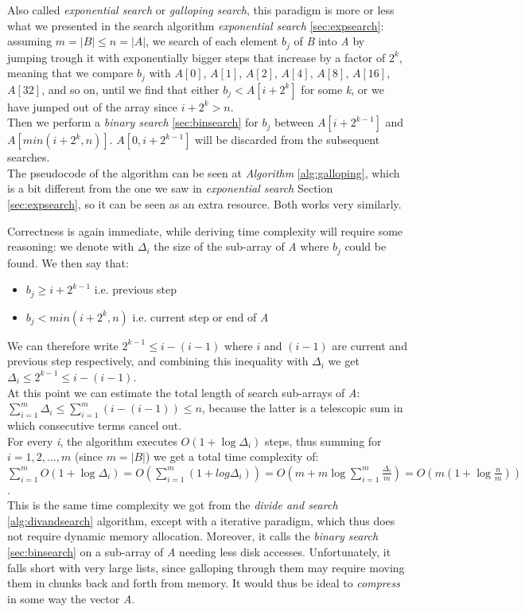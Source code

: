 Also called \textit{exponential search} or \textit{galloping search}, this paradigm is more or less what we presented in the search algorithm \textit{exponential search} \ref{sec:expsearch}: assuming $m=|B| \leq n=|A|$, we search of each element $b_j$ of \textit{B} into \textit{A} by jumping trough it with exponentially bigger steps that increase by a factor of $2^k$, meaning that we compare $b_j$ with $A[0]$, $A[1]$, $A[2]$, $A[4]$, $A[8]$, $A[16]$, $A[32]$, and so on, until we find that either $b_j<A\left[i+2^k\right]$ for some \textit{k}, or we have jumped out of the array since $i+2^k>n$.\\
Then we perform a \textit{binary search} \ref{sec:binsearch} for $b_j$ between $A\left[i+2^{k-1}\right]$ and $A\left[min\left(i+2^k, n\right)\right]$. $A\left[0, i+2^{k-1}\right]$ will be discarded from the subsequent searches.\\
The pseudocode of the algorithm can be seen at \textit{Algorithm} \ref{alg:galloping}, which is a bit different from the one we saw in \textit{exponential search} Section \ref{sec:expsearch}, so it can be seen as an extra resource. Both works very similarly.

Correctness is again immediate, while deriving time complexity will require some reasoning: we denote with $\Delta_i$ the size of the sub-array of \textit{A} where $b_j$ could be found.
We then say that:
\begin{itemize} 
    \item $b_j \geq i+2^{k-1}$ i.e. previous step
    \item $b_j<min\left(i+2^k,n\right)$ i.e. current step or end of \textit{A}
\end{itemize}

We can therefore write $2^{k-1} \leq i-(i-1)$ where $i$ and $(i-1)$ are current and previous step respectively, and combining this inequality with $\Delta_i$ we get $\Delta_i \leq 2^{k-1} \leq i-(i-1)$. \\
At this point we can estimate the total length of search sub-arrays of \textit{A}: $\sum_{i=1}^{m} \Delta_i \leq \sum_{i=1}^{m} (i-(i-1)) \leq n$, because the latter is a telescopic sum in which consecutive terms cancel out.\\
For every \textit{i}, the algorithm executes $O\left(1+ \log \Delta_i\right)$ steps, thus summing for $i = 1,2,...,m$ (since $m=|B|$) we get a total time complexity of:\\
$\sum_{i=1}^m O\left(1+ \log \Delta_i\right)=O\left(\sum_{i=1}^{m}\left(1+log \Delta_i\right)\right)=O\left(m+m \log \sum_{i=1}^m \frac{\Delta_i}{m}\right)=O\left(m\left(1+ \log \frac{n}{m}\right)\right)$.\\
This is the same time complexity we got from the \textit{divide and search} \ref{alg:divandsearch} algorithm, except with a iterative paradigm, which thus does not require dynamic memory allocation. Moreover, it calls the \textit{binary search} \ref{sec:binsearch} on a sub-array of \textit{A} needing less disk accesses. Unfortunately, it falls short with very large lists, since galloping through them may require moving them in chunks back and forth from memory. It would thus be ideal to \textit{compress} in some way the vector \textit{A}.

